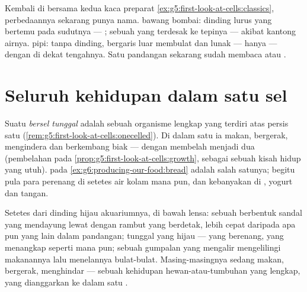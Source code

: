 \begin{example}\label{ex:g6:cell-unit-of-life:slides}
Kembali di  bersama kedua kaca preparat
\cref{ex:g5:first-look-at-cells:classics}, perbedaannya sekarang punya
nama.  bawang bombai: dinding lurus yang bertemu pada sudutnya
--- ; sebuah  yang terdesak ke tepinya --- akibat
kantong airnya.  pipi: tanpa dinding, bergaris luar membulat dan
lunak --- hanya  --- dengan  di dekat tengahnya.
Satu pandangan sekarang sudah membaca  atau .
\end{example}

\section{Seluruh kehidupan dalam satu sel}

\begin{definition}\label{def:g6:cell-unit-of-life:unicellular}
Suatu  \emph{bersel tunggal} adalah
sebuah organisme lengkap yang terdiri atas persis satu 
(\cref{rem:g5:first-look-at-cells:onecelled}). Di dalam satu 
ia makan, bergerak, mengindera dan berkembang biak --- dengan membelah
menjadi dua
(pembelahan pada \cref{prop:g5:first-look-at-cells:growth}, sebagai
sebuah kisah hidup yang utuh).  pada
\cref{ex:g6:producing-our-food:bread} adalah salah satunya; begitu
pula para perenang di setetes air kolam mana pun, dan kebanyakan
 di , yogurt dan tangan.
\end{definition}

\begin{example}\label{ex:g6:cell-unit-of-life:drop}
Setetes dari dinding hijau akuariumnya, di bawah lensa: sebuah 
berbentuk sandal yang mendayung lewat dengan rambut yang berdetak,
lebih cepat daripada apa pun yang lain dalam pandangan;  tunggal
yang hijau ---  yang berenang, yang menangkap  seperti
 mana pun; sebuah gumpalan yang mengalir mengelilingi makanannya
lalu menelannya bulat-bulat. Masing-masingnya sedang makan, bergerak,
menghindar --- sebuah kehidupan hewan-atau-tumbuhan yang lengkap, yang
dianggarkan ke dalam satu .
\end{example}

